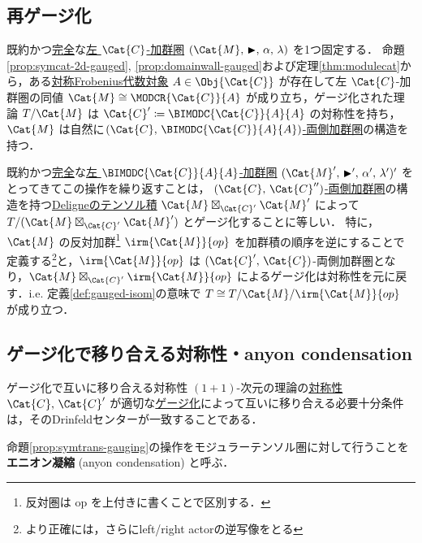 \documentclass[TQFT_main]{subfiles}
\begin{document}
\subsection{再ゲージ化}

既約かつ\hyperref[def:modulecat-exact]{完全}な\hyperref[def:modulecat]{左 $\Cat{C}$-加群圏} $(\Cat{M},\, \btr,\, \alpha,\, \lambda)$ を1つ固定する．
命題\ref{prop:symcat-2d-gauged}, \ref{prop:domainwall-gauged}および定理\ref{thm:modulecat}から，ある\hyperref[def:sym-Frobenius]{対称Frobenius代数対象} $A \in \Obj{\Cat{C}}$ が存在して左 $\Cat{C}$-加群圏の同値 $\Cat{M} \cong \MODCR{\Cat{C}}{A}$ が成り立ち，ゲージ化された理論 $T/\Cat{M}$ は $\Cat{C}' \coloneqq \BIMODC{\Cat{C}}{A}{A}$ の対称性を持ち，$\Cat{M}$ は自然に\hyperref[def:bimodule-cat]{$(\Cat{C},\, \BIMODC{\Cat{C}}{A}{A})$-両側加群圏}の構造を持つ．

既約かつ\hyperref[def:modulecat-exact]{完全}な\hyperref[def:modulecat]{左 $\BIMODC{\Cat{C}}{A}{A}$-加群圏} $(\Cat{M}',\, \btr',\, \alpha',\, \lambda')'$ をとってきてこの操作を繰り返すことは，
\hyperref[def:bimodule-cat]{$(\Cat{C},\, \Cat{C}'')$-両側加群圏}の構造を持つ\hyperref[def:DeligneProduct]{Deligneのテンソル積} $\Cat{M} \boxtimes_{\Cat{C}'} \Cat{M}'$ によって $T/(\Cat{M} \boxtimes_{\Cat{C}'} \Cat{M}')$ とゲージ化することに等しい．
特に，$\Cat{M}$ の反対加群\footnote{反対圏は op を上付きに書くことで区別する．} $\irm{\Cat{M}}{op}$ を加群積の順序を逆にすることで定義する\footnote{より正確には，さらにleft/right actorの逆写像をとる}と，$\irm{\Cat{M}}{op}$ は $(\Cat{C}',\, \Cat{C})$-両側加群圏となり，$\Cat{M} \boxtimes_{\Cat{C}'} \irm{\Cat{M}}{op}$ によるゲージ化は対称性を元に戻す．i.e. 定義\ref{def:gauged-isom}の意味で $T \cong T/\Cat{M}/\irm{\Cat{M}}{op}$ が成り立つ．

\subsection{ゲージ化で移り合える対称性・anyon condensation}

\begin{myprop}[label=prop:symtrans-gauging]{ゲージ化で互いに移り合える対称性}
    $(1+1)$-次元の理論の\hyperref[ax:symcat-2d-0form]{対称性} $\Cat{C},\, \Cat{C}'$ が適切な\hyperref[def:gauging]{ゲージ化}によって互いに移り合える必要十分条件は，そのDrinfeldセンターが一致することである．
\end{myprop}

命題\ref{prop:symtrans-gauging}の操作をモジュラーテンソル圏に対して行うことを\textbf{エニオン凝縮} (anyon condensation) と呼ぶ．
\end{document}
